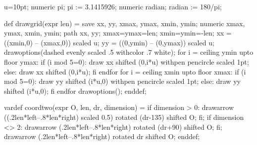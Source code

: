 \begin{mpostdef}
u=10pt;
numeric pi; pi := 3.1415926;
numeric radian; radian := 180/pi;

def drawgrid(expr len) =
  save xx, yy, xmax, ymax, xmin, ymin;
  numeric xmax, ymax, xmin, ymin;
  path xx, yy;
  xmax=ymax=len; xmin=ymin=-len;
  xx = ((xmin,0) -- (xmax,0)) scaled u;
  yy = ((0,ymin) -- (0,ymax)) scaled u;
  drawoptions(dashed evenly scaled .5 withcolor .7 white);
  for i = ceiling ymin upto floor ymax:
    if (i mod 5=0):
      draw xx shifted (0,i*u) withpen pencircle scaled 1pt;
    else:
      draw xx shifted (0,i*u);
    fi
  endfor
  for i = ceiling xmin upto floor xmax:
    if (i mod 5=0):
      draw yy shifted (i*u,0) withpen pencircle scaled 1pt;
    else:
      draw yy shifted (i*u,0);
    fi
  endfor
  drawoptions();
enddef;

vardef coordtwo(expr O, len, dr, dimension) =
  if dimension > 0:
    drawarrow ((.2len*left--.8*len*right) scaled 0.5) rotated (dr-135) shifted O;
  fi;
  if dimension <> 2:
    drawarrow (.2len*left--.8*len*right) rotated (dr+90) shifted O;
  fi;
  drawarrow (.2len*left--.8*len*right) rotated dr shifted O;
enddef;
\end{mpostdef}
